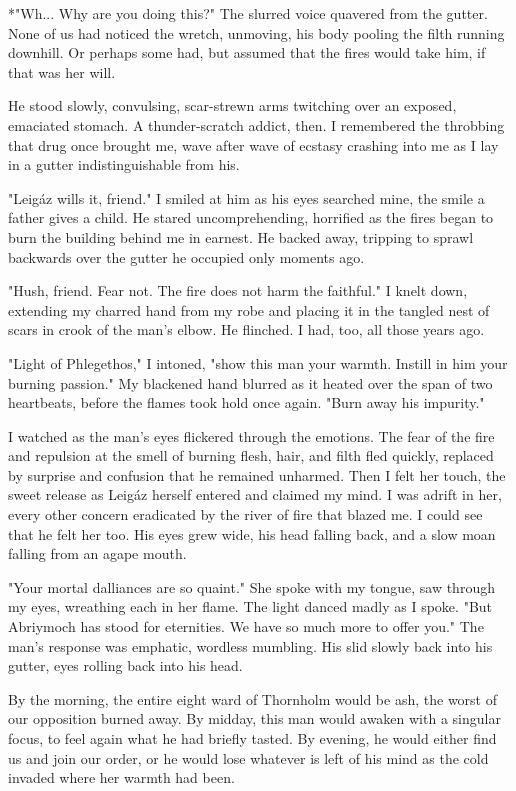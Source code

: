 *"Wh... Why are you doing this?"
 The slurred voice quavered from the gutter.
 None of us had noticed the wretch, unmoving, his body pooling the filth running downhill.
 Or perhaps some had, but assumed that the fires would take him, if that was her will.

 He stood slowly, convulsing, scar-strewn arms twitching over an exposed, emaciated stomach.
 A thunder-scratch addict, then.
 I remembered the throbbing that drug once brought me, wave after wave of ecstasy crashing into me
  as I lay in a gutter indistinguishable from his.

"Leigáz wills it, friend."
 I smiled at him as his eyes searched mine, the smile a father gives a child.
 He stared uncomprehending, horrified as the fires began to burn the building behind me in earnest.
 He backed away, tripping to sprawl backwards over the gutter he occupied only moments ago.

"Hush, friend.
 Fear not.
 The fire does not harm the faithful."
 I knelt down, extending my charred hand from my robe and placing it in the tangled nest of scars
  in crook of the man's elbow.
 He flinched.
 I had, too, all those years ago.

"Light of Phlegethos," I intoned, "show this man your warmth.
 Instill in him your burning passion."
 My blackened hand blurred as it heated over the span of two heartbeats,
  before the flames took hold once again.
 "Burn away his impurity."

 I watched as the man's eyes flickered through the emotions.
 The fear of the fire and repulsion at the smell of burning flesh, hair, and filth fled quickly,
  replaced by surprise and confusion that he remained unharmed.
 Then I felt her touch, the sweet release as Leigáz herself entered and claimed my mind.
 I was adrift in her, every other concern eradicated by the river of fire that blazed me.
 I could see that he felt her too.
 His eyes grew wide, his head falling back, and a slow moan falling from an agape mouth.

"Your mortal dalliances are so quaint."
 She spoke with my tongue, saw through my eyes, wreathing each in her flame.
 The light danced madly as I spoke.
"But Abriymoch has stood for eternities.
 We have so much more to offer you."
 The man's response was emphatic, wordless mumbling.
 His slid slowly back into his gutter, eyes rolling back into his head.

By the morning, the entire eight ward of Thornholm would be ash, the worst of our opposition burned away.
By midday, this man would awaken with a singular focus, to feel again what he had briefly tasted.
By evening, he would either find us and join our order,
 or he would lose whatever is left of his mind as the cold invaded where her warmth had been.

